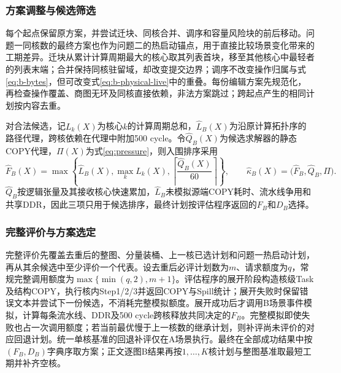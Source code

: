 \subsubsection{方案调整与候选筛选}
每个起点保留原方案，并尝试迁块、同核合并、调序和容量风险块的前后移动。问题一同核数的最终方案也作为问题二的热启动锚点，用于直接比较场景变化带来的工期差异。迁块从累计计算周期最大的核心取其列表首块，移至其他核心中最轻者的列表末端；合并保持同核驻留域，却改变提交边界；调序不改变操作归属与式\eqref{eq:b-bytes}，但可改变式\eqref{eq:b-physical-live}中的重叠。每份编辑方案先规范化，再检查操作覆盖、商图无环及同核直接依赖，非法方案跳过；跨起点产生的相同计划按内容去重。

对合法候选，记$L_k(X)$为核心$k$的计算周期总和，$\widehat L_B(X)$为沿原计算拓扑序的路径代理，跨核依赖在代理中附加500 cycle。令$\widehat Q_B(X)$为候选求解器的静态COPY代理，$\Pi(X)$为式\eqref{eq:pressure}，则入围排序采用
\begin{equation}
\widehat F_B(X)=\max\left\{\widehat L_B(X),\max_k L_k(X),
\left\lceil\frac{\widehat Q_B(X)}{60}\right\rceil\right\},\qquad
\widehat\kappa_B(X)=\bigl(\widehat F_B,\widehat Q_B,\Pi\bigr).
\label{eq:b-light-score}
\end{equation}
$\widehat Q_B$按逻辑张量及其接收核心快速累加，$\widehat L_B$未模拟源端COPY耗时、流水线争用和共享DDR，因此三项只用于候选排序，最终计划按评估程序返回的$F_B$和$D_B$选择。

\subsubsection{完整评价与方案选定}
完整评价先覆盖去重后的整图、分量装桶、上一核已选计划和问题一热启动计划，再从其余候选中至少评价一个代表。设去重后必评计划数为$m$、请求额度为$q$，常规完整调用额度为$\max\{\min(q,2),m+1\}$。评估程序的展开阶段构造核级Task及结构COPY，执行核内Step1/2/3并返回COPY与Spill统计；展开失败时保留错误文本并尝试下一份候选，不消耗完整模拟额度。展开成功后才调用B场景事件模拟，计算每条流水线、DDR及500 cycle跨核释放共同决定的$F_B$。完整模拟即使失败也占一次调用额度；若当前最优慢于上一核数的继承计划，则补评尚未评价的对应回退计划。统一单核基准的回退补评仅在A场景执行。最终在全部成功结果中按$(F_B,D_B)$字典序取方案；正文逐图B结果再按$1,\ldots,K$核计划与整图基准取最短工期并补齐空核。

